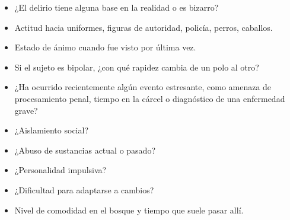 \begin{itemize}
    \item ¿El delirio tiene alguna base en la realidad o es bizarro?
    \item Actitud hacia uniformes, figuras de autoridad, policía, perros, caballos.
    \item Estado de ánimo cuando fue visto por última vez.
    \item Si el sujeto es bipolar, ¿con qué rapidez cambia de un polo al otro?
    \item ¿Ha ocurrido recientemente algún evento estresante, como amenaza de procesamiento penal, tiempo en la cárcel o diagnóstico de una enfermedad grave?
    \item ¿Aislamiento social?
    \item ¿Abuso de sustancias actual o pasado?
    \item ¿Personalidad impulsiva?
    \item ¿Dificultad para adaptarse a cambios?
    \item Nivel de comodidad en el bosque y tiempo que suele pasar allí.
\end{itemize}


